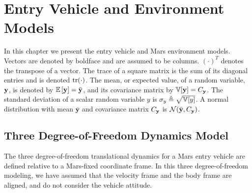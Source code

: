 \chapter{Entry Vehicle and Environment Models}
In this chapter we present the entry vehicle and Mars environment models. 
Vectors are denoted by boldface and are assumed to be columns. $(\cdot)^T$ denotes the transpose of a vector. 
The trace of a square matrix is the sum of its diagonal entries and is denoted $\mathrm{tr}(\cdot)$.   
The mean, or expected value, of a random variable, $\mathbf{y}$, is denoted by $\mathbb{E}\left[\mathbf{y}\right]=\bar{\mathbf{y}}$, and its covariance matrix by $\mathbb{V}[\mathbf{y}] = C_{\mathbf{y}}$. 
The standard deviation of a scalar random variable $y$ is $\sigma_{y} \triangleq \sqrt{\mathbb{V}[y]}$. A normal distribution with mean $\bar{\mathbf{y}}$ and covariance matrix $C_{\mathbf{y}}$ is $\mathcal{N}(\bar{\mathbf{y}}, C_{\mathbf{y}})$.

\section{Three Degree-of-Freedom Dynamics Model}
The three degree-of-freedom translational dynamics for a Mars entry vehicle are defined relative to a Mars-fixed coordinate frame. In this three degree-of-freedom modeling, we have assumed that the velocity frame and the body frame are aligned, and do not consider the vehicle attitude.
  
